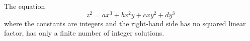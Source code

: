 \begin{proposition}\label{eq:107}
    The equation
\[
    z^2=ax^3+bx^2y+cxy^2+dy^3
\]
    where the constants are integers and the right-hand side has no squared linear factor, has only a finite number of integer solutions.
\end{proposition}
